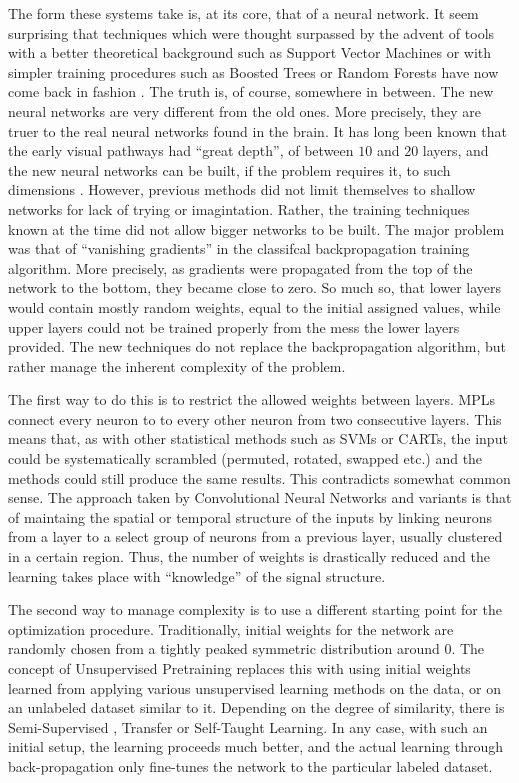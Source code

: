 \documentclass[12pt,a4paper,oneside,english]{UPBThesis}
\begin{document}
The form these systems take is, at its core, that of a neural network. It seem surprising that techniques which were thought surpassed by the advent of tools with a better theoretical background such as Support Vector Machines or with simpler training procedures such as Boosted Trees or Random Forests have now come back in fashion \cite{comparing-svm-cnn,mnist-website,best-architecture-object-recognition}. The truth is, of course, somewhere in between. The new neural networks are very different from the old ones. More precisely, they are truer to the real neural networks found in the brain. It has long been known that the early visual pathways had ``great depth'', of between $10$ and $20$ layers, and the new neural networks can be built, if the problem requires it, to such dimensions \cite{multi-column-neural-networks,gradient-based-learning}. However, previous methods did not limit themselves to shallow networks for lack of trying or imagintation. Rather, the training techniques known at the time did not allow bigger networks to be built. The major problem was that of ``vanishing gradients'' in the classifcal backpropagation training algorithm. More precisely, as gradients were propagated from the top of the network to the bottom, they became close to zero. So much so, that lower layers would contain mostly random weights, equal to the initial assigned values, while upper layers could not be trained properly from the mess the lower layers provided. The new techniques do not replace the backpropagation algorithm, but rather manage the inherent complexity of the problem.

The first way to do this is to restrict the allowed weights between layers. MPLs connect every neuron to to every other neuron from two consecutive layers. This means that, as with other statistical methods such as SVMs or CARTs, the input could be systematically scrambled (permuted, rotated, swapped etc.) and the methods could still produce the same results. This contradicts somewhat common sense. The approach taken by Convolutional Neural Networks \cite{gradient-based-learning} and variants is that of maintaing the spatial or temporal structure of the inputs by linking neurons from a layer to a select group of neurons from a previous layer, usually clustered in a certain region. Thus, the number of weights is drastically reduced and the learning takes place with ``knowledge'' of the signal structure.

The second way to manage complexity is to use a different starting point for the optimization procedure. Traditionally, initial weights for the network are randomly chosen from a tightly peaked symmetric distribution around $0$. The concept of Unsupervised Pretraining replaces this with using initial weights learned from applying various unsupervised learning methods on the data, or on an unlabeled dataset similar to it. Depending on the degree of similarity, there is Semi-Supervised \cite{text-classification-semi-supervised}, Transfer \cite{text-classification-semi-supervised} or Self-Taught \cite{self-taught-learning} Learning. In any case, with such an initial setup, the learning proceeds much better, and the actual learning through back-propagation only fine-tunes the network to the particular labeled dataset.
\end{document}
